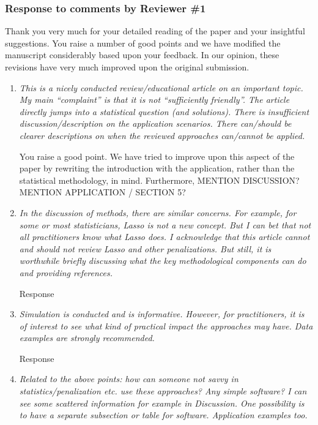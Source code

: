\documentclass{article}
\begin{document}
\subsubsection*{Response to comments by Reviewer \#1}

Thank you very much for your detailed reading of the paper and your insightful suggestions. You raise a number of good points and we have modified the manuscript considerably based upon your feedback.  In our opinion, these revisions have very much improved upon the original submission.

\begin{enumerate}

\item \emph{This is a nicely conducted review/educational article on an important topic. My main ``complaint'' is that it is not ``sufficiently friendly''.  The article directly jumps into a statistical question (and solutions). There is insufficient discussion/description on the application scenarios. There can/should be clearer descriptions on when the reviewed approaches can/cannot be applied.}

  You raise a good point.  We have tried to improve upon this aspect of the paper by rewriting the introduction with the application, rather than the statistical methodology, in mind.  Furthermore, MENTION DISCUSSION? MENTION APPLICATION / SECTION 5?

\item \emph{In the discussion of methods, there are similar concerns. For example, for some or most statisticians, Lasso is not a new concept. But I can bet that not all practitioners know what Lasso does. I acknowledge that this article cannot and should not review Lasso and other penalizations. But still, it is worthwhile briefly discussing what the key methodological components can do and providing references.}

  Response

\item \emph{Simulation is conducted and is informative. However, for practitioners, it is of interest to see what kind of practical impact the approaches may have. Data examples are strongly recommended.}

  Response

\item \emph{Related to the above points: how can someone not savvy in statistics/penalization etc. use these approaches? Any simple software? I can see some scattered information for example in Discussion. One possibility is to have a separate subsection or table for software. Application examples too.}


\end{enumerate}
\end{document}
